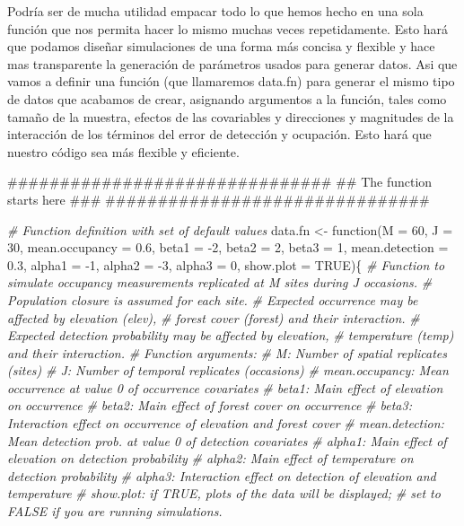 \documentclass[]{book}
\newenvironment{Shaded}{\begin{snugshade}}{\end{snugshade}}
\newcommand{\DataTypeTok}[1]{\textcolor[rgb]{0.13,0.29,0.53}{{#1}}}
\newcommand{\DecValTok}[1]{\textcolor[rgb]{0.00,0.00,0.81}{{#1}}}
\newcommand{\FloatTok}[1]{\textcolor[rgb]{0.00,0.00,0.81}{{#1}}}
\newcommand{\StringTok}[1]{\textcolor[rgb]{0.31,0.60,0.02}{{#1}}}
\newcommand{\CommentTok}[1]{\textcolor[rgb]{0.56,0.35,0.01}{\textit{{#1}}}}
\newcommand{\OtherTok}[1]{\textcolor[rgb]{0.56,0.35,0.01}{{#1}}}
\newcommand{\NormalTok}[1]{{#1}}
\begin{document}
Podría ser de mucha utilidad empacar todo lo que hemos hecho en una sola
función que nos permita hacer lo mismo muchas veces repetidamente. Esto
hará que podamos diseñar simulaciones de una forma más concisa y
flexible y hace mas transparente la generación de parámetros usados para
generar datos. Asi que vamos a definir una función (que llamaremos
data.fn) para generar el mismo tipo de datos que acabamos de crear,
asignando argumentos a la función, tales como tamaño de la muestra,
efectos de las covariables y direcciones y magnitudes de la interacción
de los términos del error de detección y ocupación. Esto hará que
nuestro código sea más flexible y eficiente.

\begin{Shaded}
\begin{Highlighting}[]
\NormalTok{###############################}
\NormalTok{## The function starts here ###}
\NormalTok{###############################}

\CommentTok{# Function definition with set of default values}
\NormalTok{data.fn <-}\StringTok{ }\NormalTok{function(}\DataTypeTok{M =} \DecValTok{60}\NormalTok{, }\DataTypeTok{J =} \DecValTok{30}\NormalTok{, }\DataTypeTok{mean.occupancy =} \FloatTok{0.6}\NormalTok{, }
                    \DataTypeTok{beta1 =} \NormalTok{-}\DecValTok{2}\NormalTok{, }\DataTypeTok{beta2 =} \DecValTok{2}\NormalTok{, }\DataTypeTok{beta3 =} \DecValTok{1}\NormalTok{, }\DataTypeTok{mean.detection =} \FloatTok{0.3}\NormalTok{, }
                    \DataTypeTok{alpha1 =} \NormalTok{-}\DecValTok{1}\NormalTok{, }\DataTypeTok{alpha2 =} \NormalTok{-}\DecValTok{3}\NormalTok{, }\DataTypeTok{alpha3 =} \DecValTok{0}\NormalTok{, }\DataTypeTok{show.plot =} \OtherTok{TRUE}\NormalTok{)\{}
\CommentTok{# Function to simulate occupancy measurements replicated at M sites during J occasions.}
\CommentTok{# Population closure is assumed for each site.}
\CommentTok{# Expected occurrence may be affected by elevation (elev), }
\CommentTok{# forest cover (forest) and their interaction.}
\CommentTok{# Expected detection probability may be affected by elevation, }
\CommentTok{# temperature (temp) and their interaction.}
\CommentTok{# Function arguments:}
\CommentTok{#     M: Number of spatial replicates (sites)}
\CommentTok{#     J: Number of temporal replicates (occasions)}
\CommentTok{#     mean.occupancy: Mean occurrence at value 0 of occurrence covariates}
\CommentTok{#     beta1: Main effect of elevation on occurrence}
\CommentTok{#     beta2: Main effect of forest cover on occurrence}
\CommentTok{#     beta3: Interaction effect on occurrence of elevation and forest cover}
\CommentTok{#     mean.detection: Mean detection prob. at value 0 of detection covariates}
\CommentTok{#     alpha1: Main effect of elevation on detection probability}
\CommentTok{#     alpha2: Main effect of temperature on detection probability}
\CommentTok{#     alpha3: Interaction effect on detection of elevation and temperature}
\CommentTok{#     show.plot: if TRUE, plots of the data will be displayed; }
\CommentTok{#               set to FALSE if you are running simulations.}


\end{Highlighting}
\end{Shaded}
\end{document}
